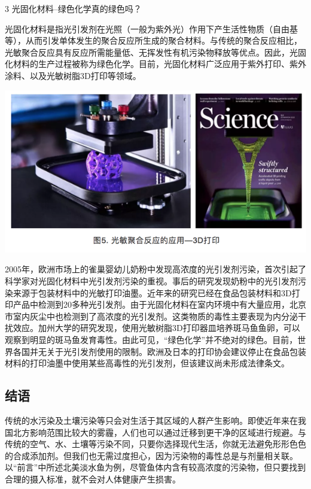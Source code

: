 \documentclass[]{book}
\begin{document}
3 光固化材料--绿色化学真的绿色吗？

光固化材料是指光引发剂在光照（一般为紫外光）作用下产生活性物质（自由基等），从而引发单体发生的聚合反应所生成的聚合材料。与传统的聚合反应相比，光敏聚合反应具有反应所需能量低、无挥发性有机污染物释放等优点。因此，光固化材料的生产过程被称为绿色化学。目前，光固化材料广泛应用于紫外打印、紫外涂料、以及光敏树脂3D打印等领域。

\includegraphics[width=8.33in]{images/epc5}

2005年，欧洲市场上的雀巢婴幼儿奶粉中发现高浓度的光引发剂污染，首次引起了科学家对光固化材料中光引发剂污染的重视。事后的研究发现奶粉中的光引发剂污染来源于包装材料中的光敏打印油墨。近年来的研究已经在食品包装材料和3D打印产品中检测到20多种光引发剂。由于光固化材料在室内环境中有大量应用，北京市室内灰尘中也检测到了高浓度的光引发剂。这类物质的毒性主要表现为内分泌干扰效应。加州大学的研究发现，使用光敏树脂3D打印器皿培养斑马鱼鱼卵，可以观察到明显的斑马鱼发育毒性。由此可见，``绿色化学''并不绝对的绿色。目前，世界各国并无关于光引发剂使用的限制。欧洲及日本的打印协会建议停止在食品包装材料的打印油墨中使用某些高毒性的光引发剂，但该建议尚未形成法律条文。

\hypertarget{ux7ed3ux8bed-2}{%
\subsection{结语}\label{ux7ed3ux8bed-2}}

传统的水污染及土壤污染等只会对生活于其区域的人群产生影响。即使近年来在我国北方影响范围比较大的雾霾，人们也可以通过迁移到更干净的区域进行规避。与传统的空气、水、土壤等污染不同，只要你选择现代生活，你就无法避免形形色色的合成添加剂。但我们也无需过度担心，因为污染物的毒性总是与剂量相关联。以``前言''中所述北美淡水鱼为例，尽管鱼体内含有较高浓度的污染物，但只要找到合理的摄入标准，就不会对人体健康产生损害。
\end{document}
